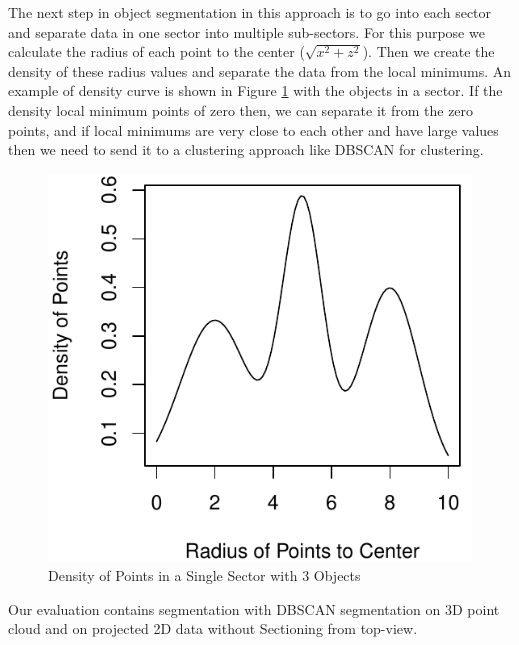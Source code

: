 The next step in object segmentation in this approach is to go into each sector and separate data in one sector into multiple sub-sectors.
For this purpose we calculate the radius of each point to the center ($\sqrt{x^2 + z^2 } $). Then we create the density of these radius values and separate the data from the local minimums.  An example of density curve is shown in Figure \ref{fig:SectorDensity} with the objects in a sector. If the density local minimum points of zero then, we can separate it from the zero points, and if local minimums are very close to each other and have large values then we need to send it to a clustering approach like DBSCAN for clustering.  

\begin{figure}[!h]
\begin{center}
  \includegraphics[scale=0.31]{./images/sectors_density.pdf}
  \caption{Density of Points in a Single Sector with 3 Objects}
  \label{fig:SectorDensity}
\end{center}
\end{figure}


Our evaluation contains segmentation with DBSCAN segmentation on 3D point cloud and on projected 2D data without Sectioning from top-view.  

